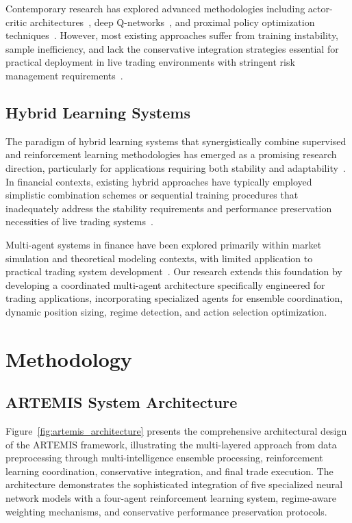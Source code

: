 \documentclass[10pt,twocolumn]{article}
\begin{document}
Contemporary research has explored advanced methodologies including actor-critic architectures~\cite{lillicrap2015continuous}, deep Q-networks~\cite{mnih2015human}, and proximal policy optimization techniques~\cite{schulman2017proximal}. However, most existing approaches suffer from training instability, sample inefficiency, and lack the conservative integration strategies essential for practical deployment in live trading environments with stringent risk management requirements~\cite{jiang2017deep}.

\subsection{Hybrid Learning Systems}

The paradigm of hybrid learning systems that synergistically combine supervised and reinforcement learning methodologies has emerged as a promising research direction, particularly for applications requiring both stability and adaptability~\cite{pan2010survey}. In financial contexts, existing hybrid approaches have typically employed simplistic combination schemes or sequential training procedures that inadequately address the stability requirements and performance preservation necessities of live trading systems~\cite{nevmyvaka2006reinforcement}.

Multi-agent systems in finance have been explored primarily within market simulation and theoretical modeling contexts, with limited application to practical trading system development~\cite{lebaron2006agent}. Our research extends this foundation by developing a coordinated multi-agent architecture specifically engineered for trading applications, incorporating specialized agents for ensemble coordination, dynamic position sizing, regime detection, and action selection optimization.

\section{Methodology}

\subsection{ARTEMIS System Architecture}

Figure~\ref{fig:artemis_architecture} presents the comprehensive architectural design of the ARTEMIS framework, illustrating the multi-layered approach from data preprocessing through multi-intelligence ensemble processing, reinforcement learning coordination, conservative integration, and final trade execution. The architecture demonstrates the sophisticated integration of five specialized neural network models with a four-agent reinforcement learning system, regime-aware weighting mechanisms, and conservative performance preservation protocols.
\end{document}
